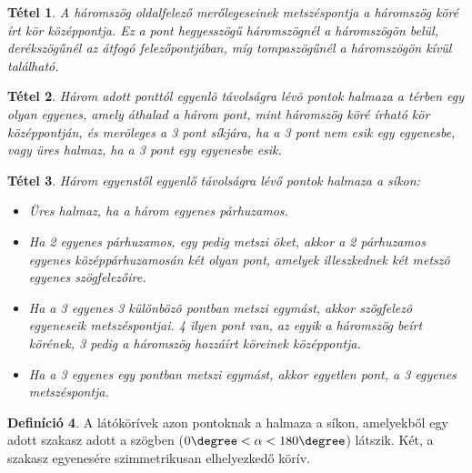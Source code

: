 \documentclass[twoside,12pt]{report}
\newtheorem{theorem}{Tétel}[section]
\theoremstyle{definition}
\newtheorem{definition}[theorem]{Definíció}
\begin{document}
	\begin{theorem}
		A háromszög oldalfelező merőlegeseinek metszéspontja a háromszög köré írt kör középpontja.	Ez a pont hegyesszögű háromszögnél a háromszögön belül, derékszögűnél az átfogó felezőpontjában, míg tompaszögűnél a háromszögön kívül található.
	\end{theorem}
	\begin{theorem}
		Három adott ponttól egyenlõ távolságra lévõ pontok halmaza a térben egy olyan egyenes,
		amely áthalad a három pont, mint háromszög köré írható kör középpontján, és merõleges
		a 3 pont síkjára, ha a 3 pont nem esik egy egyenesbe, vagy üres halmaz, ha a 3 pont egy
		egyenesbe esik.
	\end{theorem}
	\begin{theorem}
		Három egyenstől egyenlő távolságra lévő pontok halmaza a síkon:
		\begin{itemize}
			\item Üres halmaz, ha a három egyenes párhuzamos.
			\item Ha 2 egyenes párhuzamos, egy pedig metszi õket, akkor a 2 párhuzamos egyenes középpárhuzamosán két olyan pont, amelyek illeszkednek két metszõ egyenes szögfelezőire.
			\item Ha a 3 egyenes 3 különbözõ pontban metszi egymást, akkor szögfelezõ egyeneseik metszéspontjai. 4 ilyen pont van, az egyik a háromszög beírt körének, 3 pedig a háromszög hozzáírt köreinek középpontja.
			\item Ha a 3 egyenes egy pontban metszi egymást, akkor egyetlen pont, a 3 egyenes metszéspontja.
		\end{itemize}
	\end{theorem}
	\begin{definition}
		A látókörívek azon pontoknak a halmaza a síkon, amelyekből egy adott szakasz adott a szögben ($0\degree < \alpha < 180\degree$) látszik. Két, a szakasz egyenesére szimmetrikusan elhelyezkedő körív.
	\end{definition}
\end{document}
